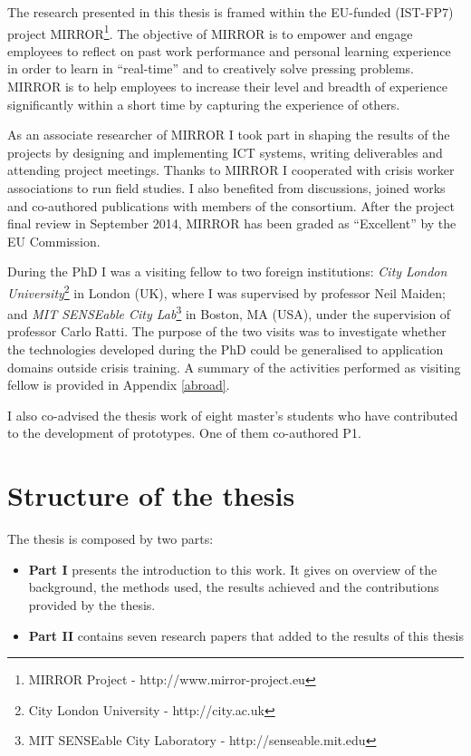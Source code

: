 The research presented in this thesis is framed within the EU-funded (IST-FP7) project MIRROR\footnote{MIRROR Project - http://www.mirror-project.eu}. The objective of MIRROR is to empower and engage employees to reflect on past work performance and personal learning experience in order to learn in “real-time” and to creatively solve pressing problems. MIRROR is to help employees to increase their level and breadth of experience significantly within a short time by capturing the experience of others.  

As an associate researcher of MIRROR I took part in shaping the results of the projects by designing and implementing ICT systems, writing deliverables and attending project meetings. Thanks to MIRROR I cooperated with crisis worker associations to run field studies. I also benefited from discussions, joined works and co-authored publications with members of the consortium. After the project final review in September 2014, MIRROR has been graded as ``Excellent'' by the EU Commission.

During the PhD I was a visiting fellow to two foreign institutions: \emph{City London University}\footnote{City London University - http://city.ac.uk} in London (UK), where I was supervised by professor Neil Maiden; and \emph{MIT SENSEable City Lab}\footnote{MIT SENSEable City Laboratory - http://senseable.mit.edu} in Boston, MA (USA), under the supervision of professor Carlo Ratti. The purpose of the two visits was to investigate whether the technologies developed during the PhD could be generalised to application domains outside crisis training. A summary of the activities performed as visiting fellow is provided in Appendix \ref{abroad}.

I also co-advised the thesis work of eight master's students who have contributed to the development of prototypes. One of them co-authored P1.

\section{Structure of the thesis}\label{structure-of-the-thesis}

The thesis is composed by two parts:

\begin{itemize}
	\item \textbf{Part I} presents the introduction to this work. It gives on overview of the background, the methods used, the results achieved and the contributions provided by the thesis.
	\item \textbf{Part II} contains seven research papers that added to the results of this thesis
\end{itemize}

